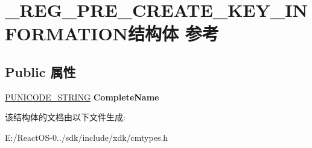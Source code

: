 \hypertarget{struct___r_e_g___p_r_e___c_r_e_a_t_e___k_e_y___i_n_f_o_r_m_a_t_i_o_n}{}\section{\+\_\+\+R\+E\+G\+\_\+\+P\+R\+E\+\_\+\+C\+R\+E\+A\+T\+E\+\_\+\+K\+E\+Y\+\_\+\+I\+N\+F\+O\+R\+M\+A\+T\+I\+O\+N结构体 参考}
\label{struct___r_e_g___p_r_e___c_r_e_a_t_e___k_e_y___i_n_f_o_r_m_a_t_i_o_n}
\subsection*{Public 属性}
\begin{DoxyCompactItemize}
\item 
\mbox{\label{struct___r_e_g___p_r_e___c_r_e_a_t_e___k_e_y___i_n_f_o_r_m_a_t_i_o_n_a127e26d632a7c6c6e03f9f9de4052b2e}} 
\hyperlink{struct___u_n_i_c_o_d_e___s_t_r_i_n_g}{P\+U\+N\+I\+C\+O\+D\+E\+\_\+\+S\+T\+R\+I\+NG} {\bfseries Complete\+Name}
\end{DoxyCompactItemize}


该结构体的文档由以下文件生成\+:\begin{DoxyCompactItemize}
\item 
E\+:/\+React\+O\+S-\/0../sdk/include/xdk/cmtypes.\+h\end{DoxyCompactItemize}

